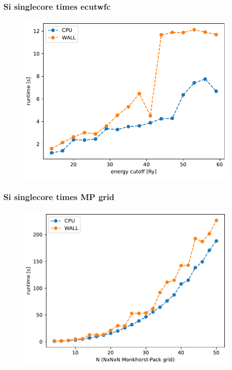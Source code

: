 \documentclass{beamer}
\begin{document}
\begin{frame}
    \frametitle{Si singlecore times ecutwfc}
    \begin{figure}
        \includegraphics[width=\linewidth, height=\textheight,keepaspectratio]{si_bench_singlecore_ecutwfc.pdf}
    \end{figure}
\end{frame}

\begin{frame}
    \frametitle{Si singlecore times MP grid}
    \begin{figure}
        \includegraphics[width=\linewidth, height=\textheight,keepaspectratio]{si_bench_singlecore_kpoints.pdf}
    \end{figure}
\end{frame}
\end{document}
